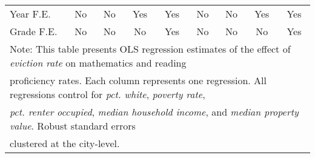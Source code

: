 \begin{table}[htbp]
\begin{tabular}{l*{8}{c}}
Year F.E.           &          No         &          No         &         Yes         &         Yes         &          No         &          No         &         Yes         &         Yes         \\
Grade F.E.          &          No         &          No         &          No         &         Yes         &          No         &          No         &          No         &         Yes         \\
\bottomrule
\multicolumn{9}{l}{\footnotesize Note: This table presents OLS regression estimates of the effect of \emph{eviction rate} on mathematics and reading}\\
\multicolumn{9}{l}{\footnotesize proficiency rates. Each column represents one regression. All regressions control for \emph{pct. white}, \emph{poverty rate},}\\
\multicolumn{9}{l}{\footnotesize \emph{pct. renter occupied}, \emph{median household income}, and \emph{median property value}. Robust standard errors}\\
\multicolumn{9}{l}{\footnotesize clustered at the city-level.}\\
\end{tabular}
\end{table}

